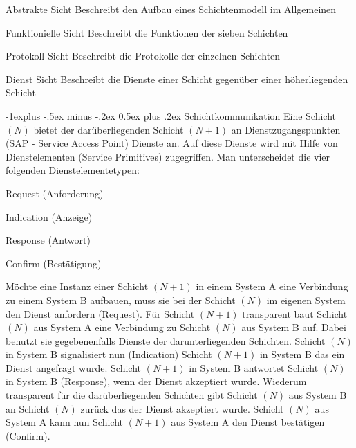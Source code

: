 \documentclass[a4paper]{article}
\makeatletter
\renewcommand{\subsection}{\@startsection{subsection}{2}{0mm}%
                                {-1explus -.5ex minus -.2ex}%
                                {0.5ex plus .2ex}%
                                {\normalfont\normalsize\bfseries}}
\makeatother
\begin{document}
\begin{multicols}{3}
    \begin{description*}
        \item[Abstrakte Sicht] Beschreibt den Aufbau eines Schichtenmodell im Allgemeinen
        \item[Funktionielle Sicht] Beschreibt die Funktionen der sieben Schichten
        \item[Protokoll Sicht] Beschreibt die Protokolle der einzelnen Schichten
        \item[Dienst Sicht] Beschreibt die Dienste einer Schicht gegenüber einer höherliegenden Schicht    
    \end{description*}
    
    \subsection{Schichtkommunikation}
    Eine Schicht $(N)$ bietet der darüberliegenden Schicht $(N +1)$ an Dienstzugangspunkten (SAP - Service Access Point) Dienste an. Auf diese Dienste wird mit Hilfe von Dienstelementen (Service Primitives) zugegriffen. Man unterscheidet die vier folgenden Dienstelementetypen:
    \begin{itemize*}
        \item Request (Anforderung)
        \item Indication (Anzeige)
        \item Response (Antwort)
        \item Confirm (Bestätigung)
    \end{itemize*}
    Möchte eine Instanz einer Schicht $(N+1)$ in einem System A eine Verbindung zu einem System B aufbauen, muss sie bei der Schicht $(N)$ im eigenen System den Dienst anfordern (Request). 
    Für Schicht $(N+1)$ transparent baut Schicht $(N)$ aus System A eine Verbindung zu Schicht $(N)$ aus System B auf. Dabei benutzt sie gegebenenfalls Dienste der darunterliegenden Schichten. 
    Schicht $(N )$ in System B signalisiert nun (Indication) Schicht $(N+1)$ in System B das ein Dienst angefragt wurde. 
    Schicht $(N +1)$ in System B antwortet Schicht $(N)$ in System B (Response), wenn der Dienst akzeptiert wurde. 
    Wiederum transparent für die darüberliegenden Schichten gibt Schicht $(N)$ aus System B an Schicht $(N )$ zurück das der Dienst akzeptiert wurde. Schicht $(N)$ aus System A kann nun Schicht $(N+1)$ aus System A den Dienst bestätigen (Confirm).
    
    \newpage
    

\end{multicols}
\end{document}
